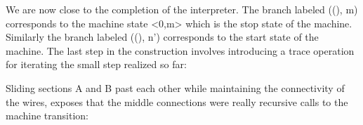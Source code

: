 \documentclass{llncs}
\begin{document}





We are now close to the completion of the interpreter.  The branch labeled
{{((), m)}} corresponds to the machine state {{<0,m>}} which is the stop
state of the machine. Similarly the branch labeled {{((), n')}} corresponds
to the start state of the machine.  The last step in the construction
involves introducing a {{trace}} operation for iterating the small step
realized so far:

\vspace{-20px}
\begin{center}
\end{center}

\noindent
Sliding sections A and B past each other while maintaining the connectivity
of the wires, exposes that the middle connections were really recursive calls
to the machine transition:

\begin{center}
\end{center}  
\end{document}

